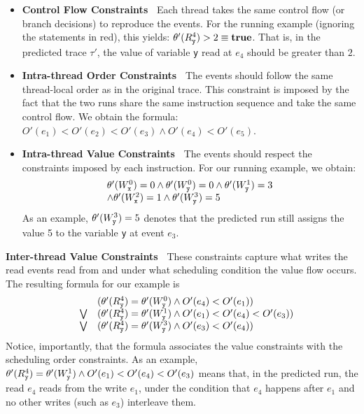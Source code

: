 \begin{itemize}
\item {\bf Control Flow Constraints\ } Each thread takes the same control flow
(or branch decisions) to reproduce the events.
 For the running example (ignoring the statements in red), this 
yields: $\theta'(R_{\tt y}^4) > 2 \equiv {\bf true}$.
That is, in the predicted trace $\tau'$, the value of variable {\tt y} 
read at $e_4$ should be greater than $2$. 


\item {\bf Intra-thread Order Constraints\ } The events should follow 
the same thread-local order as in the original trace. This constraint 
is imposed by the fact that the two runs share the same instruction 
sequence and take the same control flow. 
We obtain the  formula: $O'(e_1) < O'(e_2) < O'(e_3) \wedge O'(e_4) < O'(e_5)$.

\item {\bf Intra-thread Value Constraints\ } The events should respect the 
constraints imposed by each instruction.
 For our running example, we obtain:
$$
{\small 
\begin{array}{l}
	\theta'(W_{\tt x}^0) = 0 \wedge \theta'(W_{\tt y}^0) = 0 \wedge \theta'(W_{\tt y}^1) = 3 \\ 
	\wedge	\theta'(W_{\tt x}^2) = 1 \wedge \theta'(W_{\tt y}^3) = 5
	\end{array}
}
$$
As an example, $\theta'(W_{\tt y}^3)= 5$ denotes that the predicted run still assigns the value 5 to the variable {\tt y}  at event $e_3$.
\end{itemize}





{\bf Inter-thread Value Constraints\ } These constraints capture what writes the read events read from and under what scheduling condition the value flow occurs.  The resulting formula for our example is
$$
{\small 
\begin{array}{lcl}
	& & (\theta'(R_{\tt y}^4)=\theta'(W_{\tt y}^0) \wedge O'(e_4) < O'(e_1) ) \\
& \bigvee &
	(\theta'(R_{\tt y}^4)=\theta'(W_{\tt y}^1) \wedge O'(e_1) < O'(e_4) < O'(e_3)) \\
& \bigvee &
	(\theta'(R_{\tt y}^4)=\theta'(W_{\tt y}^3) \wedge O'(e_3) < O'(e_4))
\end{array}
}
$$    
Notice, importantly, that the formula associates the value constraints 
with the scheduling order constraints. 
As an example, 
$\theta'(R_{\tt y}^4)=\theta'(W_{\tt y}^1) \wedge O'(e_1) < O'(e_4) < O'(e_3)$ 
means that, in the predicted run, the read $e_4$ reads from the write $e_1$, 
under the condition that $e_4$ happens after $e_1$ and no other  
writes (such as $e_3$) interleave them.

